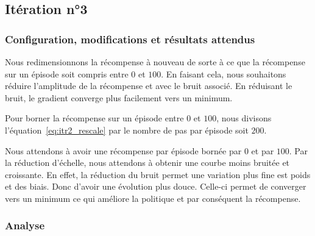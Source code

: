 \subsection{Itération n°3}

\subsubsection{Configuration, modifications et résultats attendus}

Nous redimensionnons la récompense à nouveau de sorte à ce que la récompense sur un épisode soit compris entre $0$ et $100$. En faisant cela, nous souhaitons réduire l'amplitude de la récompense et avec le bruit associé. En réduisant le bruit, le gradient converge plus facilement vers un minimum.

Pour borner la récompense sur un épisode entre $0$ et $100$, nous divisons l'équation~\ref{eq:itr2_rescale} par le nombre de pas par épisode soit $200$.

Nous attendons à avoir une récompense par épisode bornée par $0$ et par $100$. Par la réduction d'échelle, nous attendons à obtenir une courbe moins bruitée et croissante. En effet, la réduction du bruit permet une variation plus fine est poids et des biais.  Donc d'avoir une évolution plus douce. Celle-ci permet de converger vers un minimum ce qui améliore la politique et par conséquent la récompense.

\subsubsection{Analyse}

